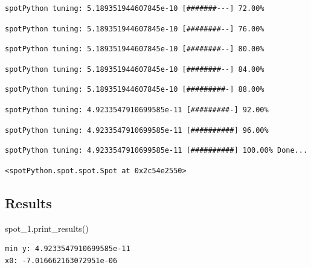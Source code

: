 \documentclass[
  letterpaper,
  DIV=11,
  numbers=noendperiod]{scrreprt}
\newenvironment{Shaded}{\begin{snugshade}}{\end{snugshade}}
\newcommand{\NormalTok}[1]{\textcolor[rgb]{0.00,0.23,0.31}{#1}}
\begin{document}
\begin{verbatim}
spotPython tuning: 5.189351944607845e-10 [#######---] 72.00% 
\end{verbatim}

\begin{verbatim}
spotPython tuning: 5.189351944607845e-10 [########--] 76.00% 
\end{verbatim}

\begin{verbatim}
spotPython tuning: 5.189351944607845e-10 [########--] 80.00% 
\end{verbatim}

\begin{verbatim}
spotPython tuning: 5.189351944607845e-10 [########--] 84.00% 
\end{verbatim}

\begin{verbatim}
spotPython tuning: 5.189351944607845e-10 [#########-] 88.00% 
\end{verbatim}

\begin{verbatim}
spotPython tuning: 4.9233547910699585e-11 [#########-] 92.00% 
\end{verbatim}

\begin{verbatim}
spotPython tuning: 4.9233547910699585e-11 [##########] 96.00% 
\end{verbatim}

\begin{verbatim}
spotPython tuning: 4.9233547910699585e-11 [##########] 100.00% Done...
\end{verbatim}

\begin{verbatim}
<spotPython.spot.spot.Spot at 0x2c54e2550>
\end{verbatim}

\hypertarget{results-3}{%
\subsection{Results}\label{results-3}}

\begin{Shaded}
\begin{Highlighting}[]
\NormalTok{spot\_1.print\_results()}
\end{Highlighting}
\end{Shaded}

\begin{verbatim}
min y: 4.9233547910699585e-11
x0: -7.016662163072951e-06
\end{verbatim}
\end{document}
